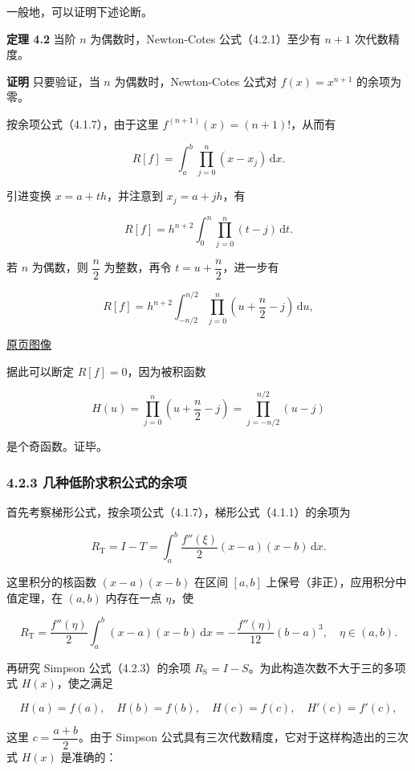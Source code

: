 \documentclass[
  10pt,
  fontset=fandol]{ctexart}
\begin{document}
一般地，可以证明下述论断。

\textbf{定理 4.2} 当阶 \(n\) 为偶数时，Newton-Cotes 公式（4.2.1）至少有 \(n+1\) 次代数精度。

\textbf{证明} 只要验证，当 \(n\) 为偶数时，Newton-Cotes 公式对 \(f(x)=x^{n+1}\) 的余项为零。

按余项公式（4.1.7），由于这里 \(f^{(n+1)}(x)=(n+1)!\)，从而有

\[
R[f]=\int_a^b\prod_{j=0}^n(x-x_j)\,\mathrm{d}x.
\]

引进变换 \(x=a+th\)，并注意到 \(x_j=a+jh\)，有

\[
R[f]=h^{n+2}\int_0^n\prod_{j=0}^n(t-j)\,\mathrm{d}t.
\]

若 \(n\) 为偶数，则 \(\dfrac n2\) 为整数，再令 \(t=u+\dfrac n2\)，进一步有

\[
R[f]=h^{n+2}\int_{-n/2}^{n/2}\prod_{j=0}^n\left(u+\frac n2-j\right)\,\mathrm{d}u,
\]

\href{../../source-images/pdf-098.jpeg}{原页图像}

据此可以断定 \(R[f]=0\)，因为被积函数

\[
H(u)=\prod_{j=0}^n\left(u+\frac n2-j\right)=\prod_{j=-n/2}^{n/2}(u-j)
\]

是个奇函数。证毕。

\subsubsection{4.2.3 几种低阶求积公式的余项}\label{ux51e0ux79cdux4f4eux9636ux6c42ux79efux516cux5f0fux7684ux4f59ux9879}

首先考察梯形公式，按余项公式（4.1.7），梯形公式（4.1.1）的余项为

\[
R_{\mathrm{T}}=I-T=\int_a^b\frac{f''(\xi)}2(x-a)(x-b)\,\mathrm{d}x.
\]

这里积分的核函数 \((x-a)(x-b)\) 在区间 \([a,b]\) 上保号（非正），应用积分中值定理，在 \((a,b)\) 内存在一点 \(\eta\)，使

\[
R_{\mathrm{T}}=\frac{f''(\eta)}2\int_a^b(x-a)(x-b)\,\mathrm{d}x
=-\frac{f''(\eta)}{12}(b-a)^3,\quad\eta\in(a,b).
\tag{4.2.5}
\]

再研究 Simpson 公式（4.2.3）的余项 \(R_{\mathrm{S}}=I-S\)。为此构造次数不大于三的多项式 \(H(x)\)，使之满足

\[
H(a)=f(a),\quad H(b)=f(b),\quad H(c)=f(c),\quad H'(c)=f'(c),
\tag{4.2.6}
\]

这里 \(c=\dfrac{a+b}{2}\)。由于 Simpson 公式具有三次代数精度，它对于这样构造出的三次式 \(H(x)\) 是准确的：
\end{document}
